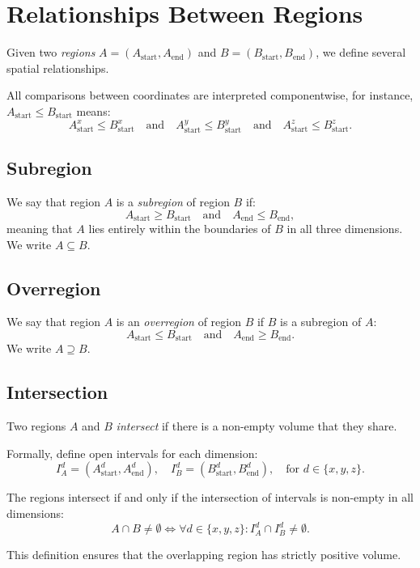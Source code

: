 \section{Relationships Between Regions}

Given two \textit{regions} $A = (A_\text{start}, A_\text{end})$  and $B = (B_\text{start}, B_\text{end})$, we define several spatial relationships.  

All comparisons between coordinates are interpreted componentwise, for instance, $A_\text{start} \leq B_\text{start}$ means:
\[
A_\text{start}^x \leq B_\text{start}^x \quad \text{and} \quad A_\text{start}^y \leq B_\text{start}^y \quad \text{and} \quad A_\text{start}^z \leq B_\text{start}^z.
\]

\subsection*{Subregion}
We say that region $A$ is a \emph{subregion} of region $B$ if:
\[
A_\text{start} \geq B_\text{start} \quad \text{and} \quad A_\text{end} \leq B_\text{end},
\]
meaning that $A$ lies entirely within the boundaries of $B$ in all three dimensions. We write $A \subseteq B$.

\subsection*{Overregion}
We say that region $A$ is an \emph{overregion} of region $B$ if $B$ is a subregion of $A$:
\[
A_\text{start} \leq B_\text{start} \quad \text{and} \quad A_\text{end} \geq B_\text{end}.
\]
We write $A \supseteq B$.


\subsection*{Intersection}
Two regions $A$ and $B$ \emph{intersect} if there is a non-empty volume that they share.

Formally, define open intervals for each dimension:
\[
I_A^d = (A_\text{start}^d, A_\text{end}^d), \quad I_B^d = (B_\text{start}^d, B_\text{end}^d), \quad \text{for } d \in \{x, y, z\}.
\]

The regions intersect if and only if the intersection of intervals is non-empty in all dimensions:
\[
A \cap B \neq \emptyset \iff \forall d \in \{x, y, z\}: I_A^d \cap I_B^d \neq \emptyset.
\]

This definition ensures that the overlapping region has strictly positive volume.



